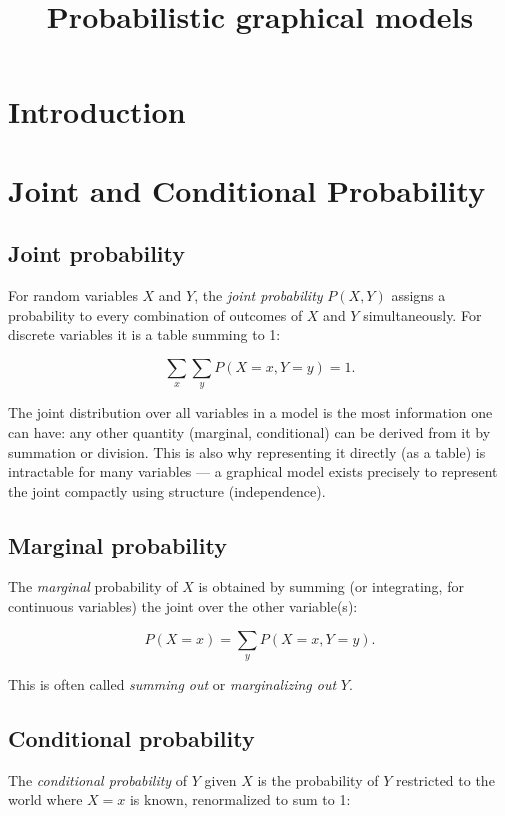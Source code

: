 \documentclass[11pt]{article}
\title{Probabilistic graphical models}
\author{}
\date{}
\begin{document}
\maketitle

\section{Introduction}

\section{Joint and Conditional Probability}

\subsection{Joint probability}

For random variables $X$ and $Y$, the \emph{joint probability} $P(X, Y)$
assigns a probability to every combination of outcomes of $X$ and $Y$
simultaneously. For discrete variables it is a table summing to 1:

\[
\sum_{x} \sum_{y} P(X = x, Y = y) = 1.
\]

The joint distribution over all variables in a model is the most information
one can have: any other quantity (marginal, conditional) can be derived from
it by summation or division. This is also why representing it directly (as a
table) is intractable for many variables — a graphical model exists precisely
to represent the joint compactly using structure (independence).

\subsection{Marginal probability}

The \emph{marginal} probability of $X$ is obtained by summing (or integrating,
for continuous variables) the joint over the other variable(s):

\[
P(X = x) = \sum_{y} P(X = x, Y = y).
\]

This is often called \emph{summing out} or \emph{marginalizing out} $Y$.

\subsection{Conditional probability}

The \emph{conditional probability} of $Y$ given $X$ is the probability of $Y$
restricted to the world where $X = x$ is known, renormalized to sum to 1:
\end{document}
